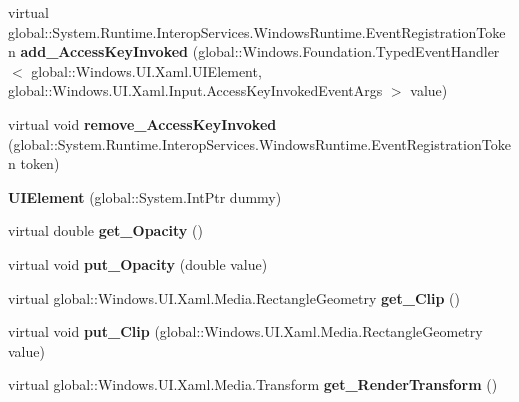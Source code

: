 \begin{DoxyCompactItemize}
virtual global\+::\+System.\+Runtime.\+Interop\+Services.\+Windows\+Runtime.\+Event\+Registration\+Token {\bfseries add\+\_\+\+Access\+Key\+Invoked} (global\+::\+Windows.\+Foundation.\+Typed\+Event\+Handler$<$ global\+::\+Windows.\+U\+I.\+Xaml.\+U\+I\+Element, global\+::\+Windows.\+U\+I.\+Xaml.\+Input.\+Access\+Key\+Invoked\+Event\+Args $>$ value)
\item 
\mbox{\label{class_windows_1_1_u_i_1_1_xaml_1_1_u_i_element_a5aad5be80c6fdb9b329d9bc29673cd07}} 
virtual void {\bfseries remove\+\_\+\+Access\+Key\+Invoked} (global\+::\+System.\+Runtime.\+Interop\+Services.\+Windows\+Runtime.\+Event\+Registration\+Token token)
\item 
\mbox{\label{class_windows_1_1_u_i_1_1_xaml_1_1_u_i_element_a27bd7accff1583615f084e98079b911a}} 
{\bfseries U\+I\+Element} (global\+::\+System.\+Int\+Ptr dummy)
\item 
\mbox{\label{class_windows_1_1_u_i_1_1_xaml_1_1_u_i_element_a0653356423d6b2e82584608c68968d68}} 
virtual double {\bfseries get\+\_\+\+Opacity} ()
\item 
\mbox{\label{class_windows_1_1_u_i_1_1_xaml_1_1_u_i_element_a1e20878dd2197db4f727f1ac47480c0a}} 
virtual void {\bfseries put\+\_\+\+Opacity} (double value)
\item 
\mbox{\label{class_windows_1_1_u_i_1_1_xaml_1_1_u_i_element_aadf0b8c76e7c0a2932dead3fd44e570c}} 
virtual global\+::\+Windows.\+U\+I.\+Xaml.\+Media.\+Rectangle\+Geometry {\bfseries get\+\_\+\+Clip} ()
\item 
\mbox{\label{class_windows_1_1_u_i_1_1_xaml_1_1_u_i_element_aa47613e3e5d780689f098981803a451d}} 
virtual void {\bfseries put\+\_\+\+Clip} (global\+::\+Windows.\+U\+I.\+Xaml.\+Media.\+Rectangle\+Geometry value)
\item 
\mbox{\label{class_windows_1_1_u_i_1_1_xaml_1_1_u_i_element_a9556f4a073076052be93c39cd96cb6a0}} 
virtual global\+::\+Windows.\+U\+I.\+Xaml.\+Media.\+Transform {\bfseries get\+\_\+\+Render\+Transform} ()

\end{DoxyCompactItemize}

